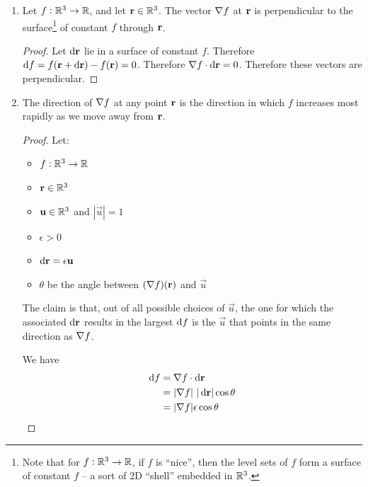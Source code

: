 \begin{enumerate}[label=(\alph*)]
\item
  \begin{claim*}
    Let $f:\mathbb{R}^3 \to \mathbb{R}$, and let $\mathbf{r} \in \mathbb{R}^3$. The vector $\nabla f$ at $\mathbf{r}$ is perpendicular to the
    surface\footnote{Note that for $f:\mathbb{R}^3 \to \mathbb{R}$, if $f$ is ``nice'', then the level sets of $f$
      form a surface of constant $f$ -- a sort of 2D ``shell'' embedded in $\mathbb{R}^3$.} of constant $f$
    through $\mathbf{r}$.
  \end{claim*}
  \begin{proof}
    Let $\d\r$ lie in a surface of constant $f$. Therefore $\df = f(\r + \d\r) - f(\r) = 0$.
    Therefore $\grad f \cdot \d\r = 0$. Therefore these vectors are perpendicular.
  \end{proof}
\item
  \begin{claim*}
    The direction of $\nabla f$ at any point $\mathbf{r}$ is the direction in which $f$ increases most
    rapidly as we move away from $\mathbf{r}$.
  \end{claim*}
  \begin{proof}
    Let:
    \begin{itemize}
    \item $f:\mathbb{R}^3 \to \mathbb{R}$
    \item $\mathbf{r} \in \mathbb{R}^3$
    \item $\mathbf u \in \mathbb{R}^3$ and $|\vec u| = 1$
    \item $\epsilon > 0$
    \item $\d\r = \epsilon\vec u$
    \item $\theta$ be the angle between $(\nabla f)(\mathbf{r})$ and $\vec u$
    \end{itemize}
    The claim is that, out of all possible choices of $\vec u$, the one for which the associated
    $\d\r$ results in the largest $\df$ is the $\vec u$ that points in the same direction as
    $\nabla f$.

    We have
    \begin{align*}
      \df
      &= \grad f \cdot \d\r \\
      &= |\grad f| ~ |\d\r| \cos \theta \\
      &= |\grad f|\epsilon \cos \theta \\
    \end{align*}

  \end{proof}
\end{enumerate}

